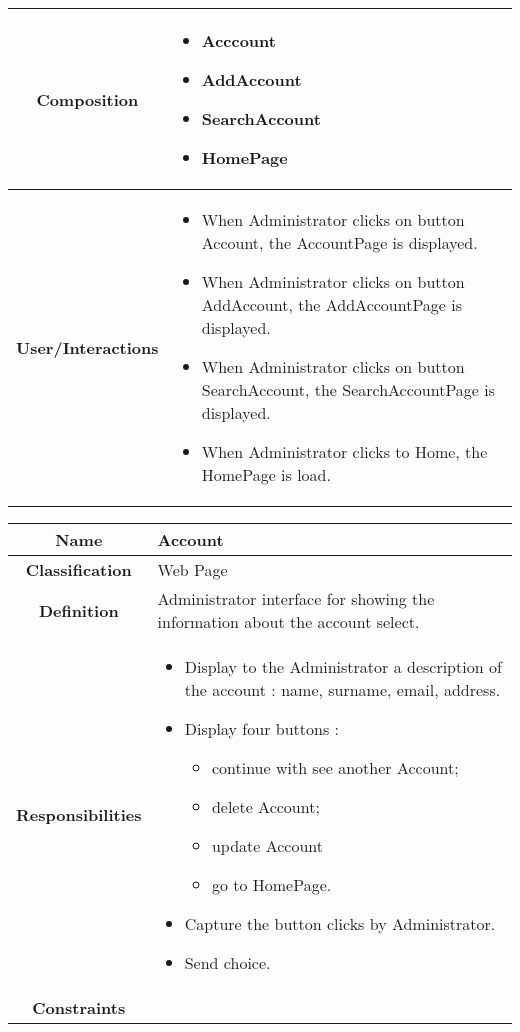 \documentclass[11pt, a4paper,titlepage]{article}
\begin{document}
\begin{enumerate}
\begin{tabularx}{\textwidth}{| c | X |}
	\\
	\hline
	\textbf{Composition} &
	\begin{itemize}
		\item Acccount
		\item AddAccount
		\item SearchAccount
		\item HomePage
	\end{itemize}
	\\
	\hline
	\textbf{User/Interactions} &
	\begin{itemize}
		\item When Administrator clicks on button Account, the AccountPage is displayed.
		\item When Administrator clicks on button AddAccount, the AddAccountPage is displayed.
		\item When Administrator clicks on button SearchAccount, the SearchAccountPage is displayed.
		\item When Administrator clicks to Home, the HomePage is load.
	\end{itemize}
	\\
	\hline 
\end{tabularx}
\begin{tabularx}{\textwidth}{| c | X |}
	\hline
	\textbf{Name} &
	Account
	\\
	\hline
	\textbf{Classification} &
	Web Page
	\\
	\hline
	\textbf{Definition} &
	Administrator interface for showing the information about the account select.\\
	\hline
	\textbf{Responsibilities} &
	\begin{itemize}
		\item Display to the Administrator a description of the account : name, surname, email, address.
		\item Display four buttons :
		\begin{itemize}
			\item continue with see another Account;
			\item delete Account;
			\item update Account
			\item go to HomePage.
		\end{itemize}
		\item Capture the button clicks by Administrator.
		\item Send choice.
	\end{itemize}
	\\
	\hline
	\textbf{Constraints} &
	\begin{itemize}

\end{itemize}
\end{tabularx}
\end{enumerate}
\end{document}

